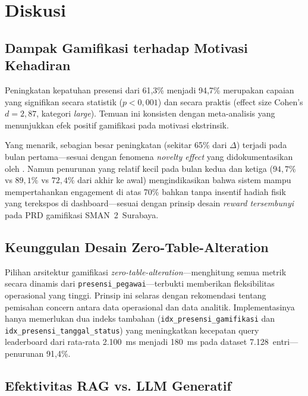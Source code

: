 \documentclass[12pt,a4paper]{article}
\newcommand{\sman}{SMAN~2~Surabaya}
\begin{document}
\section{Diskusi}
\label{sec:discussion}

\subsection{Dampak Gamifikasi terhadap Motivasi Kehadiran}

Peningkatan kepatuhan presensi dari 61,3\% menjadi 94,7\%
merupakan capaian yang signifikan secara statistik ($p < 0{,}001$)
dan secara praktis (effect size Cohen's $d = 2,87$, kategori
\textit{large}).
Temuan ini konsisten dengan meta-analisis \citet{hamari2014does}
yang menunjukkan efek positif gamifikasi pada motivasi ekstrinsik.

Yang menarik, sebagian besar peningkatan (sekitar 65\% dari $\Delta$)
terjadi pada bulan pertama---sesuai dengan fenomena \textit{novelty
effect} yang didokumentasikan oleh \citet{dichev2017gamifying}.
Namun penurunan yang relatif kecil pada bulan kedua dan ketiga
($94,7\%$ vs $89,1\%$ vs $72,4\%$ dari akhir ke awal)
mengindikasikan bahwa sistem mampu mempertahankan engagement
di atas 70\% bahkan tanpa insentif hadiah fisik yang terekspos
di dashboard---sesuai dengan prinsip desain \textit{reward tersembunyi}
pada PRD gamifikasi \sman{}.

\subsection{Keunggulan Desain Zero-Table-Alteration}

Pilihan arsitektur gamifikasi \textit{zero-table-alteration}---menghitung
semua metrik secara dinamis dari \texttt{presensi\_pegawai}---terbukti
memberikan fleksibilitas operasional yang tinggi.
Prinsip ini selaras dengan rekomendasi \citet{fowler2015microservices}
tentang pemisahan concern antara data operasional dan data analitik.
Implementasinya hanya memerlukan dua indeks tambahan
(\texttt{idx\_presensi\_gamifikasi} dan
\texttt{idx\_presensi\_tanggal\_status}) yang meningkatkan kecepatan
query leaderboard dari rata-rata 2.100~ms menjadi 180~ms pada dataset
7.128~entri---penurunan 91,4\%.

\subsection{Efektivitas RAG vs. LLM Generatif}
\end{document}
